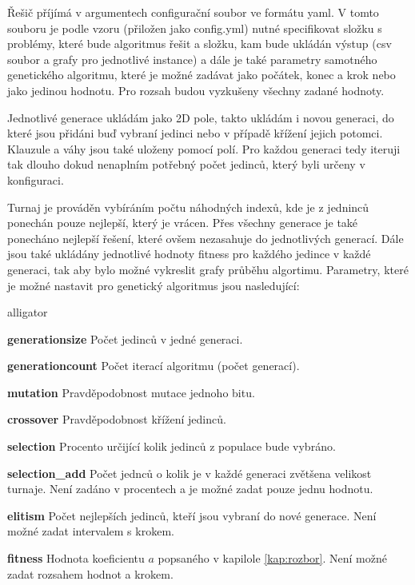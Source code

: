 \documentclass[11pt]{article}
\begin{document}
Řešič příjímá v argumentech configurační soubor ve formátu yaml. V tomto souboru je podle vzoru (přiložen jako config.yml) nutné specifikovat složku s problémy, které bude algoritmus řešit a složku, kam bude ukládán výstup (csv soubor a grafy pro jednotlivé instance) a dále je také parametry samotného genetického algoritmu, které je možné zadávat jako počátek, konec a krok nebo jako jedinou hodnotu. Pro rozsah budou vyzkušeny všechny zadané hodnoty. 

Jednotlivé generace ukládám jako 2D pole, takto ukládám i novou generaci, do které jsou přidáni buď vybraní jedinci nebo v případě křížení jejich potomci. Klauzule a váhy jsou také uloženy pomocí polí. Pro každou generaci tedy iteruji tak dlouho dokud nenaplním potřebný počet jedinců, který byli určeny v konfiguraci.

Turnaj je prováděn vybíráním počtu náhodných indexů, kde je z jedninců ponechán pouze nejlepší, který je vrácen. Přes všechny generace je také ponecháno nejlepší řešení, které ovšem nezasahuje do jednotlivých generací. Dále jsou také ukládány jednotlivé hodnoty fitness pro každého jedince v každé generaci, tak aby bylo možné vykreslit grafy průběhu algortimu. Parametry, které je možné nastavit pro genetický algoritmus jsou nasledující:

\begin{labeling}{alligator}
\item[\textbf{generationsize}] Počet jedinců v jedné generaci.
\item[\textbf{generationcount}] Počet iterací algoritmu (počet generací).
\item[\textbf{mutation}] Pravděpodobnost mutace jednoho bitu.
\item[\textbf{crossover}] Pravděpodobnost křížení jedinců.
\item[\textbf{selection}] Procento určijící kolik jedinců z populace bude vybráno.
\item[\textbf{selection\_add}] Počet jednců o kolik je v každé generaci zvětšena velikost turnaje. Není zadáno v procentech a je možné zadat pouze jednu hodnotu.
\item[\textbf{elitism}] Počet nejlepších jedinců, kteří jsou vybraní do nové generace. Není možné zadat intervalem s krokem.
\item[\textbf{fitness}] Hodnota koeficientu $a$ popsaného v kapilole \ref{kap:rozbor}. Není možné zadat rozsahem hodnot a krokem.
\end{labeling}
\end{document}
